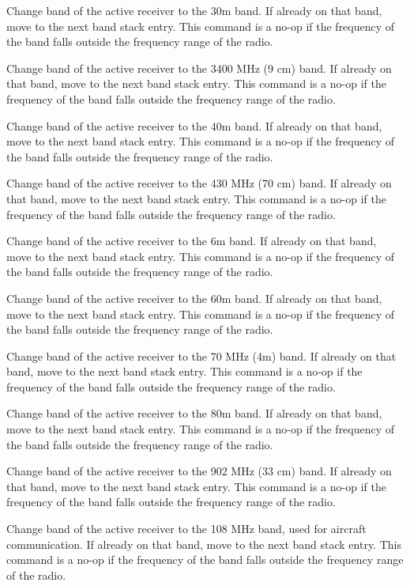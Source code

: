 \documentclass[12pt]{book}
\begin{document}
{Change band of the active receiver to the 30m band. If already on that band, move to
the next band stack entry. This command is a no-op if the frequency of the band falls outside the frequency
range of the radio.}

{Change band of the active receiver to the 3400 MHz (9 cm) band. If already on that band, move to
the next band stack entry. This command is a no-op if the frequency of the band falls outside the frequency
range of the radio.}

{Change band of the active receiver to the 40m band. If already on that band, move to
the next band stack entry. This command is a no-op if the frequency of the band falls outside the frequency
range of the radio.}

{Change band of the active receiver to the 430 MHz (70 cm) band. If already on that band, move to
the next band stack entry. This command is a no-op if the frequency of the band falls outside the frequency
range of the radio.}

{Change band of the active receiver to the 6m band. If already on that band, move to
the next band stack entry. This command is a no-op if the frequency of the band falls outside the frequency
range of the radio.}

{Change band of the active receiver to the 60m band. If already on that band, move to
the next band stack entry. This command is a no-op if the frequency of the band falls outside the frequency
range of the radio.}

{Change band of the active receiver to the 70 MHz (4m)  band. If already on that band, move to
the next band stack entry. This command is a no-op if the frequency of the band falls outside the frequency
range of the radio.}

{Change band of the active receiver to the 80m band. If already on that band, move to
the next band stack entry. This command is a no-op if the frequency of the band falls outside the frequency
range of the radio.}

{Change band of the active receiver to the 902 MHz (33 cm) band. If already on that band, move to
the next band stack entry. This command is a no-op if the frequency of the band falls outside the frequency
range of the radio.}

{Change band of the active receiver to the 108 MHz band, used for aircraft communication. If already on that
band, move to
the next band stack entry. This command is a no-op if the frequency of the band falls outside the frequency
range of the radio.}
\end{document}
